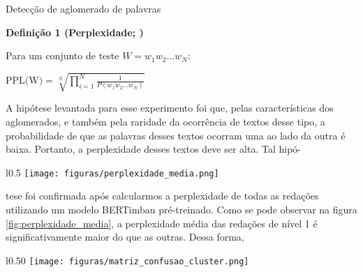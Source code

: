 \documentclass[
  xcolor={hyperref,svgnames,x11names,table},
  hyperref={pdfencoding=unicode,plainpages=false,pdfpagelabels=true,breaklinks=true},
  brazilian, english
]{beamer}
\begin{document}
\begin{frame}[fragile]
\begin{columns}[T]
\begin{block}{Detecção de aglomerado de palavras}

    \textbf{Definição 1 (Perplexidade; \cite{jurafsky_slp3})}

    Para um conjunto de teste $W = w_1w_2...w_N$:

    \vspace{12pt}

    \centering
    $\text{PPL(W)} = \sqrt[N]{ \prod_{i=1}^{N} \frac{1}{P(w_1w_2...w_N)}}$

    \vspace{12pt}

    \justifying
    A hipótese levantada para esse experimento foi que, pelas características dos aglomerados, e também pela raridade da ocorrência de textos desse tipo, a probabilidade de que as palavras desses textos ocorram uma ao lado da outra é baixa. Portanto, a perplexidade desses textos deve ser alta. Tal hipó-

    \begin{wrapfigure}{l}{0.5\textwidth} %
    \texttt{[image: figuras/perplexidade\_media.png]}
    \caption{Perplexidade média}
    \label{fig:perplexidade_media}
    \end{wrapfigure}

    tese foi confirmada após calcularmos a perplexidade de todas as redações utilizando um modelo BERTimbau pré-treinado. Como se pode observar na figura \ref{fig:perplexidade_media}, a perplexidade média das redações de nível 1 é significativamente maior do que as outras. Dessa forma,

    
    \begin{wrapfigure}{l}{0.50\textwidth} %
    \texttt{[image: figuras/matriz\_confusao\_cluster.png]}
     \caption{Melhor resultado}
    \label{fig:matriz_confusão}
    \end{wrapfigure}


\end{block}
\end{columns}
\end{frame}
\end{document}
